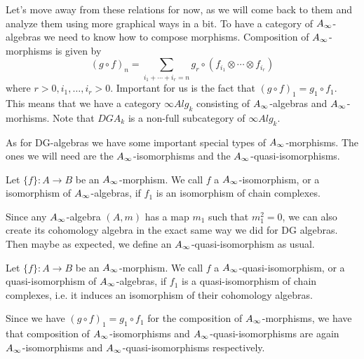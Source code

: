 Let's move away from these relations for now, as we will come back to them and analyze them using more graphical ways in a bit. To have a category of $\A$-algebras we need to know how to compose morphisms. Composition of $\A$-morphisms is given by 
\begin{equation*}
    (g\circ f)_n = \sum_{i_1+\cdots + i_r = n}g_r\circ (f_{i_1}\otimes \cdots \otimes f_{i_r})
\end{equation*}
where $r>0, i_1, \ldots, i_r>0$. Important for us is the fact that $(g\circ f)_1 = g_1\circ f_1$. This means that we have a category $\infty Alg_k$ consisting of $\A$-algebras and $\A$-morhisms. Note that $DGA_k$ is a non-full subcategory of $\infty Alg_k$. 

As for DG-algebras we have some important special types of $\A$-morphisms. The ones we will need are the $\A$-isomorphisms and the $\A$-quasi-isomorphisms.

\begin{definition}[$\A$-isomorphism]
Let $\{f\}:A\longrightarrow B$ be an $\A$-morphism. We call $f$ a $\A$-isomorphism, or a isomorphism of $\A$-algebras, if $f_1$ is an isomorphism of chain complexes.
\end{definition}

Since any $\A$-algebra $(A, m)$ has a map $m_1$ such that $m_1^2=0$, we can also create its cohomology algebra in the exact same way we did for DG algebras. Then maybe as expected, we define an $\A$-quasi-isomorphism as usual.

\begin{definition}
Let $\{f\}:A\longrightarrow B$ be an $\A$-morphism. We call $f$ a $\A$-quasi-isomorphism, or a quasi-isomorphism of $\A$-algebras, if $f_1$ is a quasi-isomorphism of chain complexes, i.e. it induces an isomorphism of their cohomology algebras. 
\end{definition}

Since we have $(g\circ f)_1 = g_1\circ f_1$ for the composition of $\A$-morphisms, we have that composition of $\A$-isomorphisms and $\A$-quasi-isomorphisms are again $\A$-isomorphisms and $\A$-quasi-isomorphisms respectively.

